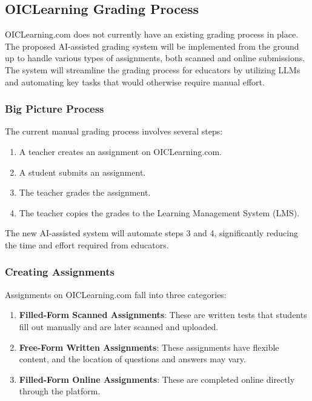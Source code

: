\documentclass[ms,twoside,print]{nuthesis}
\begin{document}
\subsection{OICLearning Grading Process}

OICLearning.com does not currently have an existing grading process in place. The proposed 
AI-assisted grading system will be implemented from the ground up to handle various types of 
assignments, both scanned and online submissions. The system will streamline the grading process 
for educators by utilizing LLMs and automating key tasks that would otherwise require manual effort.

\subsubsection{Big Picture Process}

The current manual grading process involves several steps:
\begin{enumerate}
    \item A teacher creates an assignment on OICLearning.com.
    \item A student submits an assignment.
    \item The teacher grades the assignment.
    \item The teacher copies the grades to the Learning Management System (LMS).
\end{enumerate}

The new AI-assisted system will automate steps 3 and 4, significantly reducing the time and effort required from educators.

\subsubsection{Creating Assignments}

Assignments on OICLearning.com fall into three categories:
\begin{enumerate}
    \item \textbf{Filled-Form Scanned Assignments}: These are written tests that students fill out manually and are later scanned and uploaded.
    \item \textbf{Free-Form Written Assignments}: These assignments have flexible content, and the location of questions and answers may vary.
    \item \textbf{Filled-Form Online Assignments}: These are completed online directly through the platform.
\end{enumerate}
\end{document}
